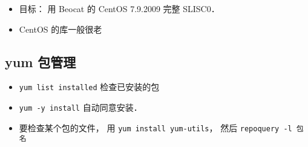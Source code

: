 
\begin{issues}
\issueDraft
\end{issues}

\begin{itemize}
\item 目标： 用 Beocat 的 CentOS 7.9.2009 完整 SLISC0．
\item CentOS 的库一般很老
\end{itemize}

\subsection{yum 包管理}
\begin{itemize}
\item \verb|yum list installed| 检查已安装的包
\item \verb|yum -y install| 自动同意安装．
\item 要检查某个包的文件， 用 \verb|yum install yum-utils|， 然后 \verb|repoquery -l 包名|
\end{itemize}

